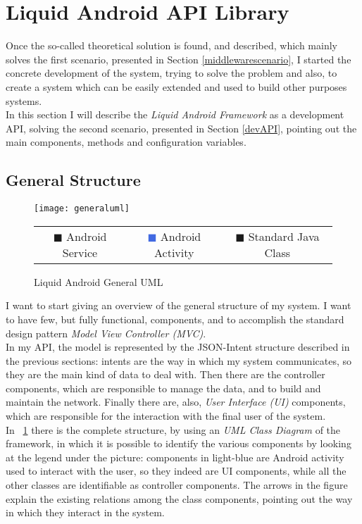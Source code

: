  
\section{Liquid Android API Library}\label{API}
Once the so-called theoretical solution is found, and described, which mainly solves the first scenario, presented in Section \ref{middlewarescenario}, I started the concrete development of the system, trying to solve the problem and also, to create a system which can be easily extended and used to build other purposes systems.\\
In this section I will describe the \textit{Liquid Android Framework} as a development API, solving the second scenario, presented in Section \ref{devAPI}, pointing out the main components, methods and configuration variables.
\subsection{General Structure}
\begin{figure}[h!]
	\centering
	\texttt{[image: generaluml]}
	\caption{Liquid Android General UML}
	\label{fig:4.7}
	\begin{tabular}{ccc}
		\textcolor{OliveGreen}{$\blacksquare$} Android Service & \textcolor{RoyalBlue}{$\blacksquare$} Android Activity & \textcolor{RoyalPurple}{$\blacksquare$} Standard Java Class\\
	\end{tabular}
\end{figure}
I want to start giving an overview of the general structure of my system. I want to have few, but fully functional, components, and to accomplish the standard design pattern \textit{Model View Controller (MVC)}.\\
In my API, the model is represented by the JSON-Intent structure described in the previous sections: intents are the way in which my system communicates, so they are the main kind of data to deal with. Then there are the controller components, which are responsible to manage the data, and to build and maintain the network. Finally there are, also, \textit{User Interface (UI)} components, which are responsible for the interaction with the final user of the system.\\
In \figurename~\ref{fig:4.7} there is the complete structure, by using an \textit{UML Class Diagram} of the framework, in which it is possible to identify the various components by looking at the legend under the picture: components in light-blue are Android activity used to interact with the user, so they indeed are UI components, while all the other classes are identifiable as controller components. The arrows in the figure explain the existing relations among the class components, pointing out the way in which they interact in the system.
